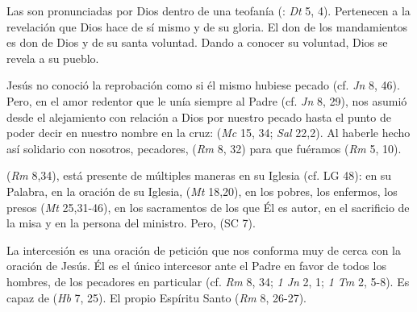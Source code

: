 \begin{ccebody}
 Las  son pronunciadas por Dios dentro de una teofanía (: \textit{Dt} 5, 4). Pertenecen a la revelación que Dios hace de sí mismo y de su gloria. El don de los mandamientos es don de Dios y de su santa voluntad. Dando a conocer su voluntad, Dios se revela a su pueblo.
\end{ccebody}


\begin{ccebody}
 Jesús no conoció la reprobación como si él mismo hubiese pecado (cf. \textit{Jn} 8, 46). Pero, en el amor redentor que le unía siempre al Padre (cf. \textit{Jn} 8, 29), nos asumió desde el alejamiento con relación a Dios por nuestro pecado hasta el punto de poder decir en nuestro nombre en la cruz:  (\textit{Mc} 15, 34; \textit{Sal} 22,2). Al haberle hecho así solidario con nosotros, pecadores,  (\textit{Rm} 8, 32) para que fuéramos  (\textit{Rm} 5, 10).


  (\textit{Rm} 8,34), está presente de múltiples maneras en su Iglesia (cf. LG 48): en su Palabra, en la oración de su Iglesia,  (\textit{Mt} 18,20), en los pobres, los enfermos, los presos (\textit{Mt} 25,31-46), en los sacramentos de los que Él es autor, en el sacrificio de la misa y en la persona del ministro. Pero,  (SC 7).


 La intercesión es una oración de petición que nos conforma muy de cerca con la oración de Jesús. Él es el único intercesor ante el Padre en favor de todos los hombres, de los pecadores en particular (cf. \textit{Rm} 8, 34; \textit{1 Jn} 2, 1; \textit{1 Tm} 2, 5-8). Es capaz de  (\textit{Hb} 7, 25). El propio Espíritu Santo  (\textit{Rm} 8, 26-27).


\end{ccebody}
